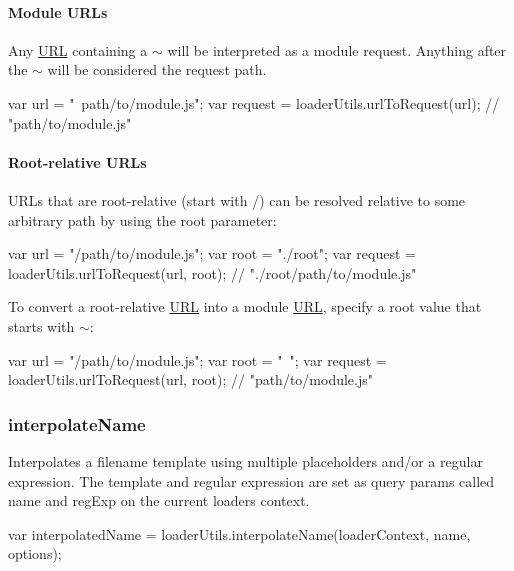 \paragraph*{Module U\+R\+Ls}

Any \mbox{\hyperlink{namespace_u_r_l}{U\+RL}} containing a {\ttfamily $\sim$} will be interpreted as a module request. Anything after the {\ttfamily $\sim$} will be considered the request path.


\begin{DoxyCode}
var url = "~path/to/module.js";
var request = loaderUtils.urlToRequest(url); // "path/to/module.js"
\end{DoxyCode}


\paragraph*{Root-\/relative U\+R\+Ls}

U\+R\+Ls that are root-\/relative (start with {\ttfamily /}) can be resolved relative to some arbitrary path by using the {\ttfamily root} parameter\+:


\begin{DoxyCode}
var url = "/path/to/module.js";
var root = "./root";
var request = loaderUtils.urlToRequest(url, root); // "./root/path/to/module.js"
\end{DoxyCode}


To convert a root-\/relative \mbox{\hyperlink{namespace_u_r_l}{U\+RL}} into a module \mbox{\hyperlink{namespace_u_r_l}{U\+RL}}, specify a {\ttfamily root} value that starts with {\ttfamily $\sim$}\+:


\begin{DoxyCode}
var url = "/path/to/module.js";
var root = "~";
var request = loaderUtils.urlToRequest(url, root); // "path/to/module.js"
\end{DoxyCode}


\subsubsection*{{\ttfamily interpolate\+Name}}

Interpolates a filename template using multiple placeholders and/or a regular expression. The template and regular expression are set as query params called {\ttfamily name} and {\ttfamily reg\+Exp} on the current loader\textquotesingle{}s context.


\begin{DoxyCode}
var interpolatedName = loaderUtils.interpolateName(loaderContext, name, options);
\end{DoxyCode}


